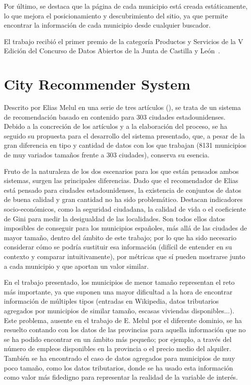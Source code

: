Por último, se destaca que la página de cada municipio está creada estáticamente, lo que mejora el posicionamiento y descubrimiento del sitio, ya que permite encontrar la información de cada municipio desde cualquier buscador.

El trabajo recibió el primer premio de la categoría Productos y Servicios de la V Edición del Concurso de Datos Abiertos de la Junta de Castilla y León~\cite{cyl}.

\section{City Recommender System}

Descrito por Elias Melul en una serie de tres artículos (\cite{US1, US2, US3}), se trata de un sistema de recomendación basado en contenido para 303 ciudades estadounidenses. Debido a la concreción de los artículos y a la elaboración del proceso, se ha seguido su propuesta para el desarrollo del sistema presentado, que, a pesar de la gran diferencia en tipo y cantidad de datos con los que trabajan (8131 municipios de muy variados tamaños frente a 303 ciudades), conserva su esencia.

Fruto de la naturaleza de los dos escenarios para los que están pensados ambos sistemas, surgen las principales diferencias. Dado que el recomendador de Elias está pensado para ciudades estadounidenses, la existencia de conjuntos de datos de buena calidad y gran cantidad no ha sido problemático. Destacan indicadores socio-económicos, como la seguridad ciudadana, la calidad de vida o el coeficiente de Gini para medir la desigualdad de las localidades. Son todos ellos datos imposibles de conseguir para los municipios españoles, más allá de las ciudades de mayor tamaño, dentro del ámbito de este trabajo; por lo que ha sido necesario considerar cómo se podría sustituir esa información (difícil de entender en su contexto y comparar intuitivamente), por métricas que sí pueden mostrarse junto a cada municipio y que aportan un valor similar.

En el trabajo presentado, los municipios de menor tamaño representan el reto más importante, ya que suponen una mayor dificultad a la hora de encontrar información de múltiples tipos (entradas en Wikipedia, datos tributarios agregados por municipios de similar tamaño, escasas viviendas disponibles...). Este problema, ausente en el trabajo de E. Melul por el diferente dominio, se ha resuelto contando con los datos de las provincias para aquella información que no se ha podido encontrar en un ámbito más pequeño; por ejemplo, a través del número de empleos disponibles en la provincia o el precio medio del alquiler. También se ha encontrado el caso de datos agregados para municipios de muy poco tamaño, como los datos tributarios, donde se ha usado esta información como valor más fidedigno para representar la realidad de la variable de interés.

